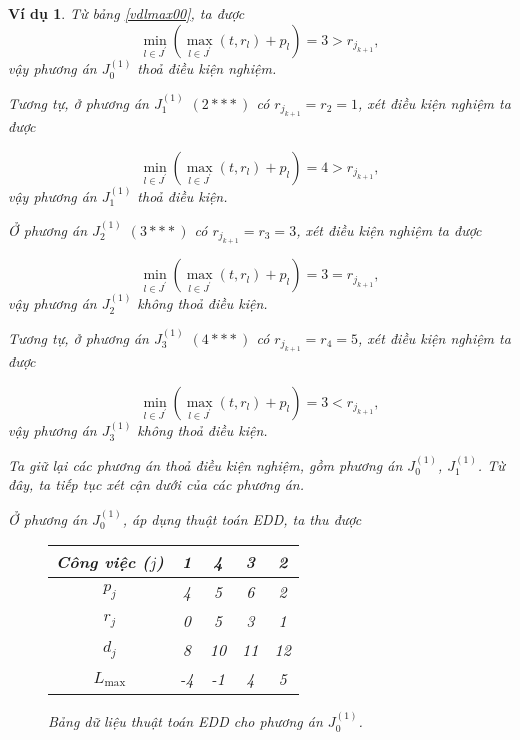 \documentclass[12pt,a4paper]{report}
\newtheorem{vd}{Ví dụ}
\begin{document}
\begin{vd}
Từ bảng \eqref{vdlmax00}, ta được
\begin{equation*}
\underset{l \in J^{'}}{\min} (\underset{l \in J^{'}}{\max} (t, r_l) + p_l) = 3 > r_{j_{k+1}},
\end{equation*}
vậy phương án $J_0^{(1)}$ thoả điều kiện nghiệm.

Tương tự, ở phương án $J_1^{(1)}$ $(2***)$ có $r_{j_{k+1}} = r_2 = 1$, xét điều kiện nghiệm ta được

\begin{equation*}
\underset{l \in J^{'}}{\min} (\underset{l \in J^{'}}{\max} (t, r_l) + p_l) = 4 > r_{j_{k+1}},
\end{equation*}
vậy phương án $J_1^{(1)}$ thoả điều kiện.


Ở phương án $J_2^{(1)}$ $(3***)$ có $r_{j_{k+1}} = r_3 = 3$, xét điều kiện nghiệm ta được

\begin{equation*}
\underset{l \in J^{'}}{\min} (\underset{l \in J^{'}}{\max} (t, r_l) + p_l) = 3 = r_{j_{k+1}},
\end{equation*}
vậy phương án $J_2^{(1)}$ không thoả điều kiện.

Tương tự, ở phương án $J_3^{(1)}$ $(4***)$ có $r_{j_{k+1}} = r_4 = 5$, xét điều kiện nghiệm ta được

\begin{equation*}
\underset{l \in J^{'}}{\min} (\underset{l \in J^{'}}{\max} (t, r_l) + p_l) = 3 < r_{j_{k+1}},
\end{equation*}
vậy phương án $J_3^{(1)}$ không thoả điều kiện.

Ta giữ lại các phương án thoả điều kiện nghiệm, gồm phương án $J_0^{(1)}$, $J_1^{(1)}$. Từ đây, ta tiếp tục xét cận dưới của các phương án.

Ở phương án $J_0^{(1)}$, áp dụng thuật toán EDD, ta thu được

\begin{figure}[h!]
	\centering
	\begin{tabular}{|c | c c c c |} 
	\hline
	Công việc ($j$) & 1 & 4 & 3 & 2 \\
	\hline\hline
	$p_j$ & 4 & 5 & 6 & 2 \\
	$r_j$ & 0 & 5 & 3 & 1 \\
	$d_j$ & 8 & 10 & 11 & 12 \\
	$L_{\max}$ & -4 & -1 & 4 & 5 \\ 
	\hline
	\end{tabular}
\caption{\label{eddj01} Bảng dữ liệu thuật toán EDD cho phương án $J_0^{(1)}$.}
\end{figure}


\end{vd}
\end{document}
